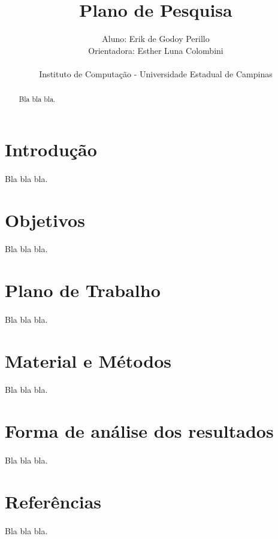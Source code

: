 \documentclass[11pt]{article}
\begin{document}
\title{Plano de Pesquisa}
\author{Aluno: Erik de Godoy Perillo\\
		Orientadora: Esther Luna Colombini\\
		\\
		Instituto de Computação - Universidade Estadual de Campinas}
\date{}
\maketitle
\begin{abstract}
Bla bla bla.
\end{abstract}

\newpage


\section{Introdução}
\paragraph{}
Bla bla bla.

\section{Objetivos}
\paragraph{}
Bla bla bla.

\section{Plano de Trabalho}
\paragraph{}
Bla bla bla.

\section{Material e Métodos}
\paragraph{}
Bla bla bla.

\section{Forma de análise dos resultados}
\paragraph{}
Bla bla bla.

\section{Referências}
\paragraph{}
Bla bla bla.
\end{document}
